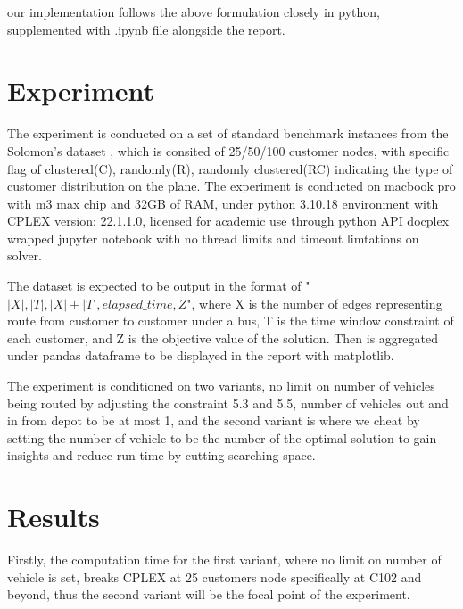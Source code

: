 \documentclass[twocolumn, 10pt]{article}
\begin{document}
our implementation follows the above formulation closely in python, supplemented with .ipynb file alongside the report. 




\section*{Experiment}
The experiment is conducted on a set of standard benchmark instances from the Solomon's dataset \cite{solomon_dataset}, which
is consited of 25/50/100 customer nodes, with specific flag of clustered(C), randomly(R), randomly clustered(RC) indicating the type of customer distribution on the plane.
The experiment is conducted on macbook pro with m3 max chip and 32GB of RAM, under python 3.10.18 environment with CPLEX version: 22.1.1.0, licensed for academic use through 
python API docplex wrapped jupyter notebook with no thread limits and timeout limtations on solver.

The dataset is expected to be output in the format of "$|X|, |T|, |X|+ |T|, elapsed\_time, Z$", where X is 
the number of edges representing route from customer to customer under a bus, T is the time window constraint of each customer, and Z is the objective value of the solution. 
Then is aggregated under pandas dataframe to be displayed in the report with matplotlib.

The experiment is conditioned on two variants, no limit on number of vehicles being routed by adjusting the constraint 5.3 and 5.5, number of vehicles out and in from depot to be at most 1, 
and the second variant is where we cheat by setting the number of vehicle to be the number of the optimal solution to gain insights and reduce run time by cutting searching space. 
\section*{Results}
Firstly, the computation time for the first variant, where no limit on number of vehicle is set, breaks CPLEX at 25 customers node specifically at C102 and beyond, 
thus the second variant will be the focal point of the experiment.
\end{document}
